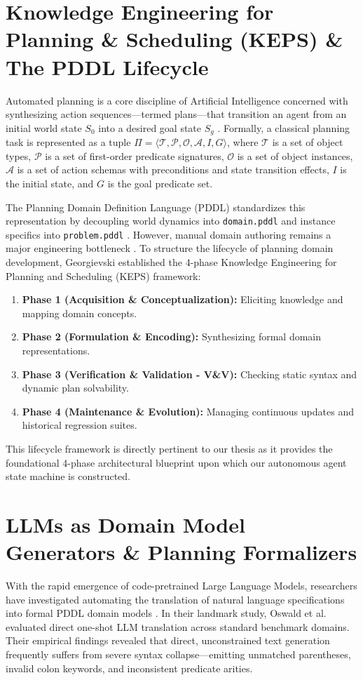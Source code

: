 \documentclass[11pt,a4paper]{report}
\begin{document}
\section{Knowledge Engineering for Planning \& Scheduling (KEPS) \& The PDDL Lifecycle}
Automated planning is a core discipline of Artificial Intelligence concerned with synthesizing action sequences—termed plans—that transition an agent from an initial world state $S_0$ into a desired goal state $S_g$ \cite{ghallab2004}. Formally, a classical planning task is represented as a tuple $\Pi = \langle \mathcal{T}, \mathcal{P}, \mathcal{O}, \mathcal{A}, I, G \rangle$, where $\mathcal{T}$ is a set of object types, $\mathcal{P}$ is a set of first-order predicate signatures, $\mathcal{O}$ is a set of object instances, $\mathcal{A}$ is a set of action schemas with preconditions and state transition effects, $I$ is the initial state, and $G$ is the goal predicate set.

The Planning Domain Definition Language (PDDL) standardizes this representation by decoupling world dynamics into \texttt{domain.pddl} and instance specifics into \texttt{problem.pddl} \cite{mcdermott1998}. However, manual domain authoring remains a major engineering bottleneck \cite{georgievski2024}. To structure the lifecycle of planning domain development, Georgievski \cite{georgievski2023, georgievski2024} established the 4-phase Knowledge Engineering for Planning and Scheduling (KEPS) framework:
\begin{enumerate}
    \item \textbf{Phase 1 (Acquisition \& Conceptualization):} Eliciting knowledge and mapping domain concepts.
    \item \textbf{Phase 2 (Formulation \& Encoding):} Synthesizing formal domain representations.
    \item \textbf{Phase 3 (Verification \& Validation - V\&V):} Checking static syntax and dynamic plan solvability.
    \item \textbf{Phase 4 (Maintenance \& Evolution):} Managing continuous updates and historical regression suites.
\end{enumerate}
This lifecycle framework is directly pertinent to our thesis as it provides the foundational 4-phase architectural blueprint upon which our autonomous agent state machine is constructed.

\section{LLMs as Domain Model Generators \& Planning Formalizers}
With the rapid emergence of code-pretrained Large Language Models, researchers have investigated automating the translation of natural language specifications into formal PDDL domain models \cite{oswald2024, valmeekam2023}. In their landmark study, Oswald et al. \cite{oswald2024} evaluated direct one-shot LLM translation across standard benchmark domains. Their empirical findings revealed that direct, unconstrained text generation frequently suffers from severe syntax collapse—emitting unmatched parentheses, invalid colon keywords, and inconsistent predicate arities.
\end{document}
